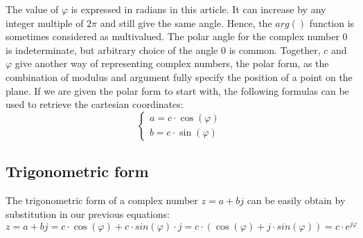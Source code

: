 \documentclass[12pt,oneside,openany]{memoir}
\numberwithin{equation}{subsection}
\begin{document}
The value of \(\varphi\) is expressed in radians in this article. It can increase by any integer multiple of \(2\pi\) and still give the same angle. Hence, the \(arg()\) function is sometimes considered as multivalued. The polar angle for the complex number 0 is indeterminate, but arbitrary choice of the angle 0 is common. Together, \(c\) and \(\varphi\) give another way of representing complex numbers, the polar form, as the combination of modulus and argument fully specify the position of a point on the plane.
\bigbreak
If we are given the polar form to start with, the following formulas can be used to retrieve the cartesian coordinates:
\[
	\begin{cases}
		a = c \cdot \cos(\varphi)\\
		b = c \cdot \sin(\varphi)
	\end{cases}
\]

\subsection{Trigonometric form}
The trigonometric form of a complex number \(z = a + bj\) can be easily obtain by substitution in our previous equations:
\[
	z = a + bj = c \cdot \cos(\varphi) + c \cdot sin(\varphi) \cdot j = c \cdot (\cos(\varphi) + j \cdot sin(\varphi)) = c \cdot e^{j \varphi}
\]
\end{document}
